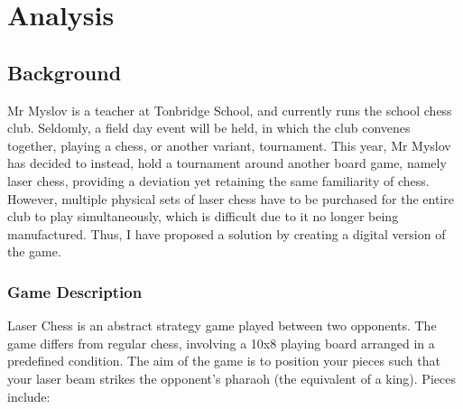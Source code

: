 \documentclass[../main/main.tex]{subfiles}
\begin{document}
\newpage

\chapter{Analysis}
\section{Background}
Mr Myslov is a teacher at Tonbridge School, and currently runs the school chess club. Seldomly, a field day event will be held, in which the club convenes together, playing a chess, or another variant, tournament. This year, Mr Myslov has decided to instead, hold a tournament around another board game, namely laser chess, providing a deviation yet retaining the same familiarity of chess. However, multiple physical sets of laser chess have to be purchased for the entire club to play simultaneously, which is difficult due to it no longer being manufactured. Thus, I have proposed a solution by creating a digital version of the game.

\subsection{Game Description}
Laser Chess is an abstract strategy game played between two opponents. The game differs from regular chess, involving a 10x8 playing board arranged in a predefined condition. The aim of the game is to position your pieces such that your laser beam strikes the opponent's pharaoh (the equivalent of a king). Pieces include:
\end{document}
